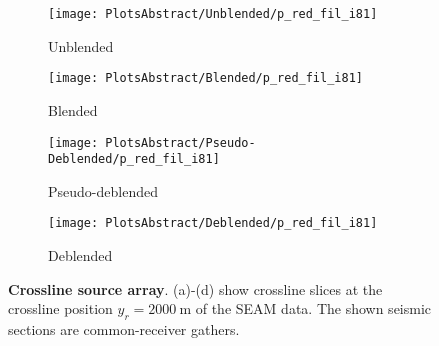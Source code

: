 \documentclass{madrid15WS}
\begin{document}
\begin{figure}[h!]
	\centering
	\begin{subfigure}[t]{0.2\textwidth}
		\centering
		\texttt{[image: PlotsAbstract/Unblended/p\_red\_fil\_i81]}
		\caption{Unblended}
		\label{fig:Example-Unblendedx}
	\end{subfigure}
	\centering
	\begin{subfigure}[t]{0.11286\textwidth}
		\centering
		\texttt{[image: PlotsAbstract/Blended/p\_red\_fil\_i81]}
		\caption{Blended}
		\label{fig:Example-Blendedx}
	\end{subfigure}
	\centering
	\begin{subfigure}[t]{0.2\textwidth}
		\centering
		\texttt{[image: PlotsAbstract/Pseudo-Deblended/p\_red\_fil\_i81]} %
		\caption{Pseudo-deblended}
		\label{fig:Example-Pseudox}
	\end{subfigure}
	\centering
	\begin{subfigure}[t]{0.2\textwidth}
		\centering
		\texttt{[image: PlotsAbstract/Deblended/p\_red\_fil\_i81]} %
		\caption{Deblended}
		\label{fig:Example-Deblendedx}
	\end{subfigure}
		
	\caption{\textbf{Crossline source array}. (a)-(d) show crossline slices at the crossline position $y_r = \SI{2000}{\metre}$ of the SEAM data. The shown seismic sections are common-receiver gathers.}
	\label{fig:Example-Inline-Slices}

\end{figure}
\end{document}
